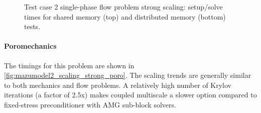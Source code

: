 \begin{figure} [htbp]
  \begin{subfigure}[t]{0.48\textwidth}
    \centering
    
  \end{subfigure}
  \hfill
  \begin{subfigure}[t]{0.48\textwidth}
  \hspace{\textwidth}
  \end{subfigure}
  \begin{subfigure}[t]{0.48\textwidth}
    \centering
    
  \end{subfigure}
  \hfill
  \begin{subfigure}[t]{0.48\textwidth}
    \centering
    
  \end{subfigure}
  \caption[Test case 2 single-phase flow problem strong scaling]{Test case 2 single-phase flow problem strong scaling: setup/solve times for shared memory (top) and distributed memory (bottom) tests.}
  \label{fig:mazumodel2_scaling_strong_flow}
\end{figure}

\paragraph{Poromechanics}
The timings for this problem are shown in \cref{fig:mazumodel2_scaling_strong_poro}.   The scaling trends are generally similar to both mechanics and flow problems.   A relatively high number of Krylov iterations (a factor of 2.5x) makes coupled multiscale a slower option compared to fixed-stress preconditioner with AMG sub-block solvers.

